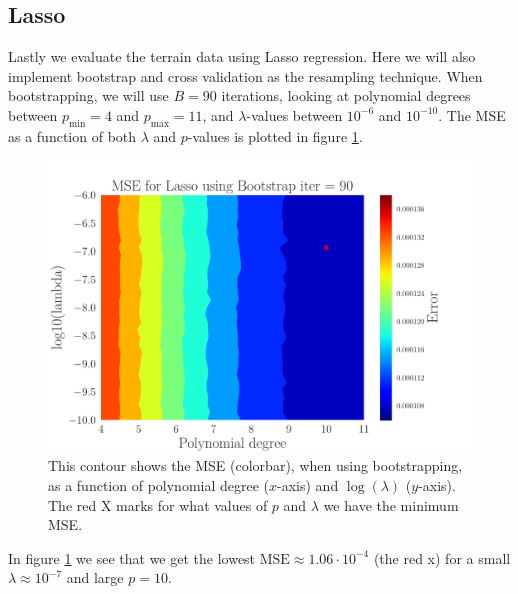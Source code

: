 \documentclass[reprint,english,notitlepage,aps,nobalancelastpage,nofootinbib]{revtex4-1}  %
\begin{document}
\subsection*{Lasso}
Lastly we evaluate the terrain data using Lasso regression. Here we will also implement bootstrap and cross validation as the resampling technique.  When bootstrapping, we will use $B=90$ iterations, looking at polynomial degrees between $p_\text{min} = 4$ and $p_\text{max} = 11$, and $\lambda$-values between $10^{-6}$ and $10^{-10}$. The MSE as a function of both $\lambda$ and $p$-values is plotted in figure \ref{fig:terrain_Lasso_MSE_Boot}.
\begin{figure}[h]
	\includegraphics[width=0.8\linewidth]{SRTM_Contour_PL_Lasso_Bootstrap90_n50_eps0.2_p4_11_lmbm6_m10.pdf}
	\caption{This contour shows the MSE (colorbar), when using bootstrapping, as a function of polynomial degree ($x$-axis) and $\log(\lambda)$ ($y$-axis). The red X marks for what values of $p$ and $\lambda$ we have the minimum MSE.}
	\label{fig:terrain_Lasso_MSE_Boot}
\end{figure}
In figure \ref{fig:terrain_Lasso_MSE_Boot} we see that we get the lowest $\text{MSE} \approx 1.06\cdot10^{-4}$ (the red x) for a small $\lambda \approx 10^{-7}$ and large $p = 10$.
\end{document}
